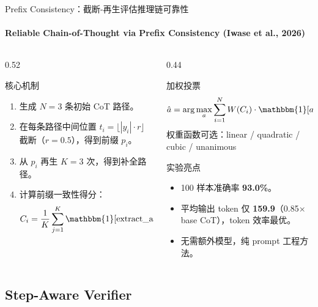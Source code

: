 \documentclass[10pt,aspectratio=169]{beamer}
\newcommand{\tightitems}{\setlength{\itemsep}{0.24em}}
\begin{document}
\begin{frame}{Prefix Consistency：截断-再生评估推理链可靠性}
  \framesubtitle{Reliable Chain-of-Thought via Prefix Consistency (Iwase et al., 2026)}
  \small
  \begin{columns}[T,onlytextwidth]
    \begin{column}{0.52\textwidth}
      \begin{block}{核心机制}
        \begin{enumerate}
          \tightitems
          \item 生成 $N=3$ 条初始 CoT 路径。
          \item 在每条路径中间位置 $t_i = \lfloor |y_i| \cdot r \rfloor$ 截断（$r=0.5$），得到前缀 $p_i$。
          \item 从 $p_i$ 再生 $K=3$ 次，得到补全路径。
          \item 计算前缀一致性得分：
          \[
            C_i = \frac{1}{K} \sum_{j=1}^{K} \mathbbm{1}[\text{extract\_answer}(y_{i,j}^{\prime}) = a_i]
          \]
        \end{enumerate}
      \end{block}
    \end{column}
    \begin{column}{0.44\textwidth}
      \begin{block}{加权投票}
        \[
          \hat{a} = \arg\max_{a} \sum_{i=1}^{N} W(C_i) \cdot \mathbbm{1}[a_i = a]
        \]
        \vspace{-0.3em}
        权重函数可选：linear / quadratic / cubic / unanimous
      \end{block}
      \begin{alertblock}{实验亮点}
        \begin{itemize}
          \tightitems
          \item 100 样本准确率 \textbf{93.0\%}。
          \item 平均输出 token 仅 \textbf{159.9}（0.85× base CoT），token 效率最优。
          \item 无需额外模型，纯 prompt 工程方法。
        \end{itemize}
      \end{alertblock}
    \end{column}
  \end{columns}
\end{frame}

\subsection{Step-Aware Verifier}
\end{document}
